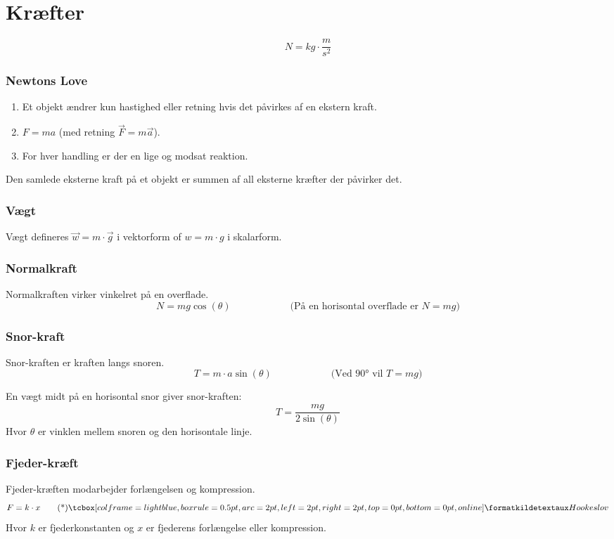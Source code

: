 \section{Kræfter}

\[
    N = kg \cdot \frac{m}{s^2}
\]

\subsubsection{Newtons Love}
\begin{enumerate}
    \item Et objekt ændrer kun hastighed eller retning hvis det påvirkes af en ekstern kraft.
    \item $F = ma$ (med retning $\vec F = m\vec a$).
    \item For hver handling er der en lige og modsat reaktion.
\end{enumerate}

Den samlede eksterne kraft på et objekt er summen af all eksterne kræfter der påvirker det.

\subsubsection{Vægt}
Vægt defineres $\vec w = m \cdot \vec g$ i vektorform of $w = m \cdot g$ i skalarform.

\subsubsection{Normalkraft}
Normalkraften virker vinkelret på en overflade. 
\[
    N = mg \cos(\theta) \hspace{6em} \text{(På en horisontal overflade er } N = mg\text{)}
\]

\subsubsection{Snor-kraft}
Snor-kraften er kraften langs snoren. 
\[
    T = m \cdot a \sin(\theta) \hspace{6em} \text{(Ved 90° vil } T = mg\text{)}
\]

En vægt midt på en horisontal snor giver snor-kraften:
\[
    T = \frac{mg}{2 \sin(\theta)}
\]
Hvor $\theta$ er vinklen mellem snoren og den horisontale linje.

\subsubsection{Fjeder-kræft}
Fjeder-kræften modarbejder forlængelsen og kompression.
\[
    F = k \cdot x \kildetag{Hookes lov}
\]
Hvor $k$ er fjederkonstanten og $x$ er fjederens forlængelse eller kompression.


